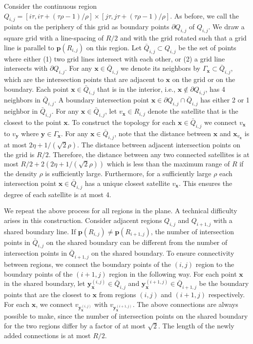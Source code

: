 \documentclass[acmsmall, screen]{acmart}
\begin{document}
Consider the continuous region $Q_{i,j} = [i\tau, i\tau + (\tau\rho - 1)/\rho] \times [j\tau, j\tau + (\tau\rho - 1)/\rho]$. 
As before, we call the points on the periphery of this grid as boundary points $\partial Q_{i,j}$ of $Q_{i,j}$. 
We draw a square grid with a line-spacing of $R/2$ and with the grid rotated such that a grid line is parallel to $\mathbf{p}(R_{i,j})$ on this region. 
Let $\bar{Q}_{i,j} \subset Q_{i,j}$ be the set of points where either (1) two grid lines intersect with each other, or (2) a grid line intersects with $\partial Q_{i,j}$. 
For any $\mathbf{x} \in \bar{Q}_{i,j}$ we denote its neighbors by $\Gamma_\mathbf{x} \subset \bar{Q}_{i,j}$, which are the intersection points that are adjacent to $\mathbf{x}$ on the grid or on the boundary. 
Each point $\mathbf{x} \in \bar{Q}_{i,j}$ that is in the interior, i.e., $\mathbf{x} \notin \partial Q_{i,j}$, has 4 neighbors in $\bar{Q}_{i,j}$.  
A boundary intersection point $\mathbf{x} \in \partial Q_{i,j} \cap \bar{Q}_{i,j}$ has either 2 or 1 neighbor in $\bar{Q}_{i,j}$.  
For any $\mathbf{x} \in \bar{Q}_{i,j}$, let $v_\mathbf{x} \in R_{i,j}$ denote the satellite that is the closest to the point $\mathbf{x}$. 
To construct the topology for each $\mathbf{x} \in \bar{Q}_{i,j}$ we connect $v_\mathbf{x}$ to $v_\mathbf{y}$ where $\mathbf{y} \in \Gamma_\mathbf{x}$. 
For any $\mathbf{x} \in \bar{Q}_{i,j}$, note that the distance between $\mathbf{x}$ and $\mathbf{x}_{v_\mathbf{x}}$ is at most $2\eta + 1/(\sqrt{2}\rho)$. 
The distance between adjacent intersection points on the grid is $R/2$. 
Therefore, the distance between any two connected satellites is at most $R/2 + 2(2\eta + 1/(\sqrt{2}\rho))$ which is less than the maximum range of $R$ if the density $\rho$ is sufficiently large. 
Furthermore, for a sufficiently large $\rho$ each intersection point $\mathbf{x} \in \bar{Q}_{i,j}$ has a unique closest satellite $v_\mathbf{x}$. 
This ensures the degree of each satellite is at most 4. 

We repeat the above process for all regions in the plane.
A technical difficulty arises in this construction. 
Consider adjacent regions $Q_{i,j}$ and $Q_{i+1,j}$ with a shared boundary line. 
If $\mathbf{p}(R_{i,j}) \neq \mathbf{p}(R_{i+1,j})$, the number of intersection points in $\bar{Q}_{i,j}$ on the shared boundary can be different from the number of intersection points in $\bar{Q}_{i+1,j}$ on the shared boundary. 
To ensure connectivity between regions, we connect the boundary points of the $(i,j)$ region to the boundary points of the $(i+1, j)$ region in the following way. 
For each point $\mathbf{x}$ in the shared boundary, let $\mathbf{y}_\mathbf{x}^{(i,j)} \in \bar{Q}_{i,j}$ and $\mathbf{y}_\mathbf{x}^{(i+1,j)} \in \bar{Q}_{i+1,j}$ be the boundary points that are the closest to $\mathbf{x}$ from regions $(i,j)$ and $(i+1, j)$ respectively. 
For each $\mathbf{x}$, we connect $v_{\mathbf{y}_\mathbf{x}^{(i,j)}}$ with $v_{\mathbf{y}_\mathbf{x}^{(i+1,j)}}$.
The above connections are always possible to make, since the number of intersection points on the shared boundary for the two regions differ by a factor of at most $\sqrt{2}$. 
The length of the newly added connections is at most $R/2$. 
 
\end{document}

